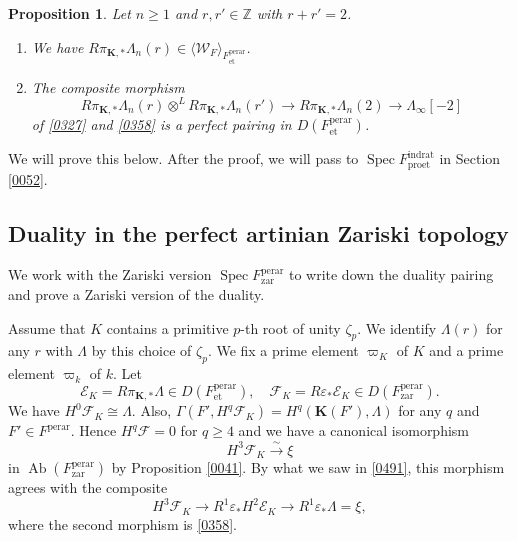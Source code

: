 \documentclass{amsart}
\newtheorem{Prop}[Thm]{Proposition}
\theoremstyle{remark}
\numberwithin{equation}{subsection}
\newcommand{\isomto}{\overset{\sim}{\to}}
\newcommand{\tensor}{\mathbin{\otimes}}
\newcommand{\Z}{\mathbb{Z}}
\newcommand{\et}{\mathrm{et}}
\newcommand{\zar}{\mathrm{zar}}
\newcommand{\rat}{\mathrm{rat}}
\newcommand{\ind}{\mathrm{ind}}
\newcommand{\pro}{\mathrm{pro}}
\newcommand{\perar}{\mathrm{perar}}
\newcommand{\alg}[1]{\mathbf{#1}}
\newcommand{\genby}[1]{\langle #1 \rangle}
\DeclareMathOperator{\Spec}{Spec}
\DeclareMathOperator{\Ab}{Ab}
\begin{document}
\begin{Prop} \label{0055}
	Let $n \ge 1$ and $r, r' \in \Z$ with $r + r' = 2$.
	\begin{enumerate}
		\item
			We have
			$R \pi_{\alg{K}, \ast} \Lambda_{n}(r) \in \genby{\mathcal{W}_{F}}_{F^{\perar}_{\et}}$.
		\item
			The composite morphism
				\begin{equation} \label{0439}
							R \pi_{\alg{K}, \ast} \Lambda_{n}(r)
						\tensor^{L}
							R \pi_{\alg{K}, \ast} \Lambda_{n}(r')
					\to
						R \pi_{\alg{K}, \ast} \Lambda_{n}(2)
					\to
						\Lambda_{\infty}[-2]
				\end{equation}
			of \eqref{0327} and \eqref{0358} is a perfect pairing in $D(F^{\perar}_{\et})$.
	\end{enumerate}
\end{Prop}

We will prove this below.
After the proof, we will pass to $\Spec F^{\ind\rat}_{\pro\et}$
in Section \ref{0052}.


\subsection{Duality in the perfect artinian Zariski topology}
\label{0048}

We work with the Zariski version $\Spec F^{\perar}_{\zar}$
to write down the duality pairing
and prove a Zariski version of the duality.

Assume that $K$ contains a primitive $p$-th root of unity $\zeta_{p}$.
We identify $\Lambda(r)$ for any $r$ with $\Lambda$ by this choice of $\zeta_{p}$.
We fix a prime element $\varpi_{K}$ of $K$
and a prime element $\varpi_{k}$ of $k$.
Let
	\[
				\mathcal{E}_{K}
			=
				R \pi_{\alg{K}, \ast} \Lambda
			\in
				D(F^{\perar}_{\et}),
		\quad
				\mathcal{F}_{K}
			=
				R \varepsilon_{\ast} \mathcal{E}_{K}
			\in
				D(F^{\perar}_{\zar}).
	\]
We have $H^{0} \mathcal{F}_{K} \cong \Lambda$.
Also, $\Gamma(F', H^{q} \mathcal{F}_{K}) = H^{q}(\alg{K}(F'), \Lambda)$
for any $q$ and $F' \in F^{\perar}$.
Hence $H^{q} \mathcal{F} = 0$ for $q \ge 4$ and we have a canonical isomorphism
	\[
			H^{3} \mathcal{F}_{K} \isomto \xi
	\]
in $\Ab(F^{\perar}_{\zar})$ by Proposition \ref{0041}.
By what we saw in \eqref{0491},
this morphism agrees with the composite
	\[
			H^{3} \mathcal{F}_{K}
		\to
			R^{1} \varepsilon_{\ast} H^{2} \mathcal{E}_{K}
		\to
			R^{1} \varepsilon_{\ast} \Lambda
		=
			\xi,
	\]
where the second morphism is \eqref{0358}.
\end{document}

